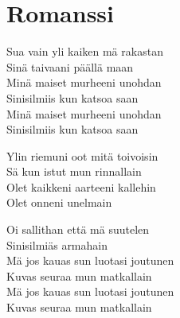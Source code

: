 \section{Romanssi}
Sua vain yli kaiken mä rakastan\\
Sinä taivaani päällä maan\\
Minä maiset murheeni unohdan\\
Sinisilmiis kun katsoa saan\\
Minä maiset murheeni unohdan\\
Sinisilmiis kun katsoa saan

Ylin riemuni oot mitä toivoisin\\
Sä kun istut mun rinnallain\\
Olet kaikkeni aarteeni kallehin\\
Olet onneni unelmain

Oi sallithan että mä suutelen\\
Sinisilmiäs armahain\\
Mä jos kauas sun luotasi joutunen\\
Kuvas seuraa mun matkallain\\
Mä jos kauas sun luotasi joutunen\\
Kuvas seuraa mun matkallain